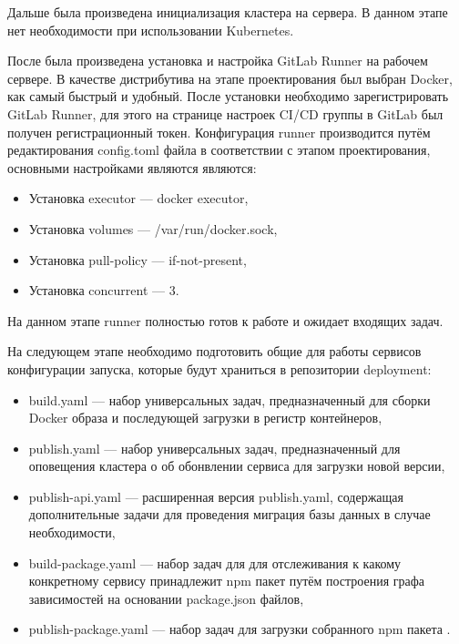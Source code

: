 Дальше была произведена инициализация кластера на сервера.
В данном этапе нет необходимости при использовании Kubernetes.

После была произведена установка и настройка GitLab Runner на рабочем сервере.
В качестве дистрибутива на этапе проектирования был выбран Docker, как самый быстрый и удобный.
После установки необходимо зарегистрировать GitLab Runner, для этого на странице настроек CI/CD группы в GitLab был получен регистрационный токен.
Конфигурация runner производится путём редактирования config.toml файла в соответствии с этапом проектирования, основными настройками являются являются:

\begin{itemize}
    \item Установка executor --- docker executor,
    \item Установка volumes --- /var/run/docker.sock,
    \item Установка pull-policy --- if-not-present,
    \item Установка concurrent --- 3.
\end{itemize}

На данном этапе runner полностью готов к работе и ожидает входящих задач.

На следующем этапе необходимо подготовить общие для работы сервисов конфигурации запуска, которые будут храниться в репозитории deployment:

\begin{itemize}
    \item build.yaml --- набор универсальных задач, предназначенный для сборки Docker образа и последующей загрузки в  регистр контейнеров,
    \item publish.yaml --- набор универсальных задач, предназначенный для оповещения кластера о об обонвлении сервиса для загрузки новой версии,
    \item publish-api.yaml --- расширенная версия publish.yaml, содержащая дополнительные задачи для проведения миграция базы данных в случае необходимости,
    \item build-package.yaml --- набор задач для для отслеживания к какому конкретному сервису принадлежит npm пакет путём построения графа зависимостей на основании package.json файлов,
    \item publish-package.yaml --- набор задач для загрузки собранного npm пакета .
\end{itemize}

